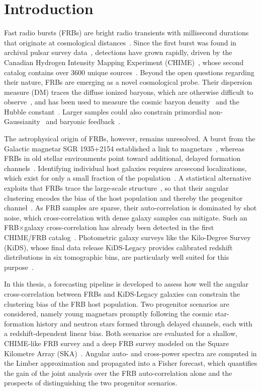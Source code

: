 \chapter{Introduction} \label{ch:introduction}

Fast radio bursts (FRBs) are bright radio transients with millisecond durations that originate at
cosmological distances~\cite{Petroff_2019}. Since the first burst was found in archival pulsar
survey data~\cite{Lorimer_2007}, detections have grown rapidly, driven by the Canadian Hydrogen 
Intensity Mapping Experiment (CHIME)~\cite{Amiri2018}, whose second catalog contains over $3600$ 
unique sources~\cite{CHIMEFRB2026}.
Beyond the open questions regarding their nature, FRBs are emerging as a novel cosmological probe.
Their dispersion measure (DM) traces the diffuse ionized baryons, which are otherwise difficult to
observe~\cite{McQuinn_2014}, and has been used to measure the cosmic baryon
density~\cite{Macquart_2020} and the Hubble constant~\cite{Hagstotz_2022}. Larger samples 
could also constrain primordial non-Gaussianity~\cite{Reischke_2021} and baryonic feedback~\cite{Sharma_2025}.

The astrophysical origin of FRBs, however, remains unresolved. A burst from the Galactic magnetar
SGR 1935+2154 established a link to magnetars~\cite{CHIMEFRB_2020}, whereas FRBs in old stellar
environments point toward additional, delayed formation channels~\cite{Wang_2020, Petroff_2022}.
Identifying individual host galaxies requires arcsecond localizations, which exist for only a small
fraction of the population~\cite{RafieiRavandi_2020}. A statistical alternative exploits that FRBs
trace the large-scale structure~\cite{MasuiSigurdson_2015}, so that their angular clustering encodes
the bias of the host population and thereby the progenitor channel~\cite{Shirasaki_2017}. As FRB
samples are sparse, their auto-correlation is dominated by shot noise, which cross-correlation with
dense galaxy samples can mitigate. Such an FRB$\times$galaxy cross-correlation has already been detected in
the first CHIME/FRB catalog~\cite{RafieiRavandi_2021}. Photometric galaxy surveys like the Kilo-Degree
Survey (KiDS), whose final data release KiDS-Legacy provides calibrated redshift distributions in
six tomographic bins, are particularly well suited for this purpose~\cite{Wright_2025, Wright_2024}.

In this thesis, a forecasting pipeline is developed to assess how well the angular cross-correlation
between FRBs and KiDS-Legacy galaxies can constrain the clustering bias of the FRB host population.
Two progenitor scenarios are considered, namely young magnetars promptly following the cosmic star-formation history
and neutron stars formed through delayed channels, each with a redshift-dependent linear
bias. Both scenarios are evaluated for a shallow, CHIME-like FRB survey and a deep FRB survey modeled on the
Square Kilometre Array (SKA)~\cite{Hashimoto_2020}.
Angular auto- and cross-power spectra are computed in the Limber approximation and propagated into a
Fisher forecast, which quantifies the gain of the joint analysis over the FRB auto-correlation alone
and the prospects of distinguishing the two progenitor scenarios.

